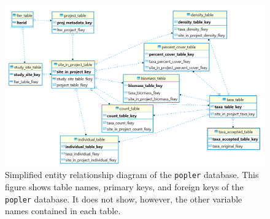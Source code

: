 \documentclass{article}\usepackage[]{graphicx}\usepackage[]{color}
\begin{document}
\setcounter{figure}{0}
\renewcommand{\thefigure}{S\arabic{figure}}

\newpage
\begin{figure}[h!]
  \begin{center}
    \includegraphics[scale=0.4]{simple_ERD}
    \caption{Simplified entity relationship diagram of the \texttt{popler} database. This figure shows table names, primary keys, and foreign keys of the \texttt{popler} database. It does not show, however, the other variable names contained in each table.}
    \label{Fig:simple_ERD}
  \end{center}
\end{figure}
\end{document}
